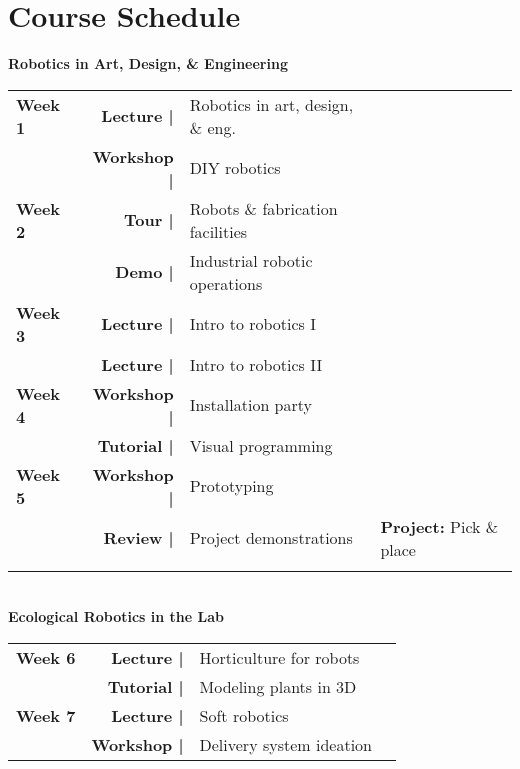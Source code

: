 \documentclass[11pt,article,oneside]{memoir}
\begin{document}

\clearpage

\section{Course Schedule}

\begin{table}[H]
%
\normalsize \textbf{Robotics in Art, Design, \& Engineering}\\
%
\small{%
\begin{tabular}{l r @{\hskip 0.1cm} l @{\hskip 0.75cm} l}
\\
\textbf{Week 1} & \textbf{Lecture |} & Robotics in art, design, \& eng. \\
\textbf{} & \textbf{Workshop |} & DIY robotics\\
%
\textbf{Week 2} & \textbf{Tour |} & Robots \& fabrication facilities\\
\textbf{} & \textbf{Demo |} & Industrial robotic operations\\
%
\textbf{Week 3} & \textbf{Lecture |} & Intro to robotics I\\
\textbf{} & \textbf{Lecture |} & Intro to robotics II\\
%
\textbf{Week 4} & \textbf{Workshop |} & Installation party\\
\textbf{} & \textbf{Tutorial |} & Visual programming \\
%
\textbf{Week 5} & \textbf{Workshop |} & Prototyping \\
\textbf{} & \textbf{Review |} & Project demonstrations & \textbf{Project:} Pick \& place\\
\\
\end{tabular}}\\
%
\normalsize \textbf{Ecological Robotics in the Lab}\\
%
\small{%
\begin{tabular}{l r @{\hskip 0.1cm} l @{\hskip 0.75cm} l}
\\
\textbf{Week 6} & \textbf{Lecture |} & Horticulture for robots\\
\textbf{} & \textbf{Tutorial |} & Modeling plants in 3D\\
%
\textbf{Week 7} & \textbf{Lecture |} & Soft robotics\\
\textbf{} & \textbf{Workshop |} & Delivery system ideation\\ 

\end{tabular}}
\end{table}
\end{document}
